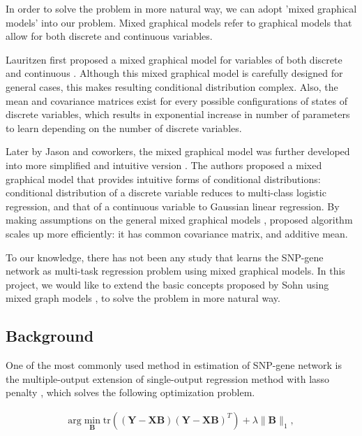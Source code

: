\documentclass{article}
\begin{document}
In order to solve the problem in more natural way, we can adopt 'mixed graphical models' into our problem.
Mixed graphical models refer to graphical models that allow for both discrete and continuous variables.


Lauritzen first proposed a mixed graphical model for variables of both discrete and continuous \cite{lauritzen1989graphical}.
 Although this mixed graphical model is carefully designed for general cases, this makes resulting conditional distribution complex. Also, the mean and covariance matrices exist for every possible configurations of states of discrete variables, which results in exponential increase in number of parameters to learn depending on the number of discrete variables.




Later by Jason and coworkers, the mixed graphical model was further developed into more simplified and intuitive version \cite{lee2013structure}. 
The authors proposed a mixed graphical model that provides intuitive forms of conditional distributions: conditional distribution of a discrete variable reduces to multi-class logistic regression, and that of a continuous variable to Gaussian linear regression. 
By making assumptions on the general mixed graphical models  \cite{lauritzen1989graphical}, proposed algorithm scales up more efficiently: it has common covariance matrix, and additive mean.


To our knowledge, there has not been any study that learns the SNP-gene network as multi-task regression problem using mixed graphical models. 
In this project, we would like to extend the basic concepts proposed by Sohn  \cite{sohn2012joint} using mixed graph models \cite{lee2013structure}, to solve the problem in more natural way.







\subsection{Background}
One of the most commonly used method in estimation of SNP-gene network is the multiple-output extension of single-output regression method with lasso penalty \cite{tibshirani1996regression}, which solves the following optimization problem.

\begin{align}\label{eq:lasso}
\text{arg} \min_{\textbf{B}} \text{tr}((\mathbf{Y}-\mathbf{XB})(\mathbf{Y}-\mathbf{XB})^T) + \lambda \| \mathbf{B}\|_1,
\end{align}
\end{document}
